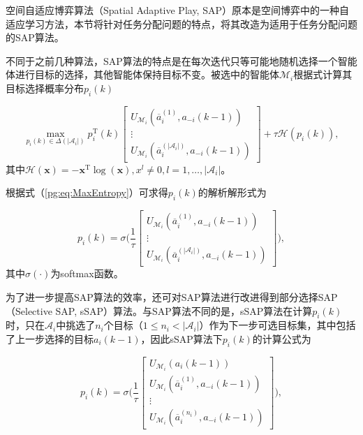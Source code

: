 空间自适应博弈算法（Spatial Adaptive Play, SAP）原本是空间博弈中的一种自适应学习方法，本节将针对任务分配问题的特点，将其改造为适用于任务分配问题的SAP算法。

不同于之前几种算法，SAP算法的特点是在每次迭代只等可能地随机选择一个智能体进行目标的选择，其他智能体保持目标不变。被选中的智能体$\mathcal{M}_i$根据式计算其目标选择概率分布$p_i(k)$

\begin{equation}
\label{pg:eq:MaxEntropy}
	\max_{p_i(k) \in \Delta(|\mathcal{A}_i|)} p_i^{\mathrm T}(k) \begin{bmatrix}
		U_{\mathcal{M}_i}(\overline a_i^{(1)},a_{-i}(k-1))\\ \vdots \\ U_{\mathcal{M}_i}(\overline a_i^{(|\mathcal{A}_i|)},a_{-i}(k-1))
	\end{bmatrix}
	+ \tau \mathcal{H}(p_i(k)),
\end{equation}
其中$\mathcal{H}({\bm x}) = -{\bm x}^{\mathrm T} \log({\bm x}), x^l \neq 0,l=1,\dots,|\mathcal{A}_i|$。

根据式（\ref{pg:eq:MaxEntropy}）可求得$p_i(k)$的解析解形式为

\begin{equation}
\label{pg:eq:sappdf}
	p_i(k) = \sigma \Bigg(\frac{1}{\tau}\begin{bmatrix}
		U_{\mathcal{M}_i}(\overline a_i^{(1)},a_{-i}(k-1))\\ \vdots \\ U_{\mathcal{M}_i}(\overline a_i^{(|\mathcal{A}_i|)},a_{-i}(k-1))
	\end{bmatrix} \Bigg),
\end{equation}
其中$\sigma(\cdot)$为softmax函数。

为了进一步提高SAP算法的效率，还可对SAP算法进行改进得到部分选择SAP（Selective SAP, sSAP）算法。与SAP算法不同的是，sSAP算法在计算$p_i(k)$时，只在$\mathcal{A}_i$中挑选了$n_i$个目标（$1 \leq n_i < |\mathcal{A}_i|$）作为下一步可选目标集，其中包括了上一步选择的目标$a_i(k-1)$，因此sSAP算法下$p_i(k)$的计算公式为

\begin{equation}
\label{pg:eq:ssappdf}
	p_i(k) = \sigma \Bigg(\frac{1}{\tau}\begin{bmatrix}
		U_{\mathcal{M}_i}(a_i(k-1))\\ U_{\mathcal{M}_i}(\overline a_i^{(1)},a_{-i}(k-1))\\
	\vdots \\ U_{\mathcal{M}_i}(\overline a_i^{(n_i)},a_{-i}(k-1))
	\end{bmatrix} \Bigg),
\end{equation}


